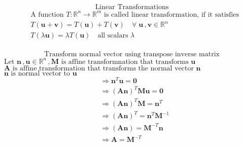 \documentclass{book}
\begin{document}
\newtheorem{theorem}{Theorem}[section]
    \[ \mbox{Linear Transformations} \]
\begin{align*}
    & \mbox{A function } \mathit{T}: \mathbb{R}^n \rightarrow \mathbb{R}^m \mbox{ is called linear transformation, if it satisfies} \\
    & \mathit{T} ( \mathbf{u} + \mathbf{v} ) = \mathit{T}(\mathbf{u}) + \mathit{T}(\mathbf{v}) \quad \forall \; \mathbf{u} \,, \mathbf{v} \in \mathbb{R}^n\\
    & \mathit{T} ( \lambda \mathbf{u} ) = \lambda \mathit{T}(\mathbf{u}) \quad \mbox{all scalars } \lambda \\
\end{align*}

\[ \mbox{Transform normal vector using transpose inverse matrix} \] 
$\mbox{Let } \mathbf{n} \,, \mathbf{u} \in \mathbb{R}^n \,, \mathbf{M} \mbox{ is affine transformnation that transforms } \mathbf{u} $\\
$\mathbf{A} \mbox{ is affine transformation that transforms the normal vector } \mathbf{n}$\\
$\mathbf{n} \mbox{ is normal vector to } \mathbf{u}$  \\
\begin{equation}
\begin{aligned}
     & \Rightarrow \mathbf{n}^{T} \mathbf{u} = \mathbf{0} \\
     & \Rightarrow (\mathbf{A}\mathbf{n})^{T} \mathbf{M}\mathbf{u} = \mathbf{0} \\
     & \Rightarrow (\mathbf{A}\mathbf{n})^{T} \mathbf{M} = \mathbf{n}^{T}\\
     & \Rightarrow (\mathbf{A}\mathbf{n})^{T} = \mathbf{n}^{T}\mathbf{M}^{-1} \\
     & \Rightarrow (\mathbf{A}\mathbf{n}) = \mathbf{M}^{-T} \mathbf{n}\\
     & \Rightarrow \mathbf{A} = \mathbf{M}^{-T} \nonumber \\
\end{aligned}
\end{equation}
\end{document}
